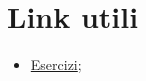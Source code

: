 \chapter*{Link utili}

\begin{itemize}
    \item \href{https://www.youmath.it/esercizi/es-analisi-matematica.html}{Esercizi};
\end{itemize}

